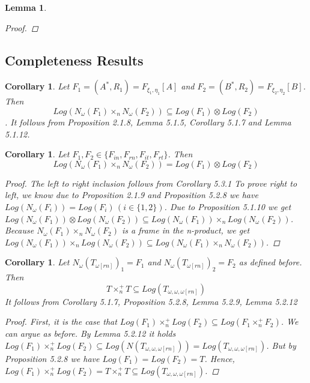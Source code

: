 \documentclass[12pt, a4paper]{scrartcl}
\newtheorem{lemma}[definition]{Lemma}
\newtheorem{corollary}[definition]{Corollary}
\begin{document}
\begin{lemma}
\begin{proof}
        \end{proof}
    \end{lemma}

    \subsection{Completeness Results}
    \begin{corollary}
        Let $F_1 = (A^*,R_1) = F_{\xi_1, \eta_1}[A]$ and $F_2 = (B^*,R_2) = F_{\xi_2, \eta_2}[B]$. Then 
        $$Log(N_\omega(F_1) \times_n N_\omega(F_2))  \subseteq Log(F_1) \otimes Log(F_2)$$.
        It follows from Proposition 2.1.8, Lemma 5.1.5, Corollary 5.1.7 and Lemma 5.1.12.
    \end{corollary}

    \begin{corollary}
        Let $F_1, F_2 \in \{F_{in}, F_{rn}, F_{it}, F_{rt}\}$. Then 
        $$Log(N_\omega(F_1) \times_nN_\omega(F_2)) = Log(F_1) \otimes Log(F_2)$$

        \begin{proof}
            The left to right inclusion follows from Corollary 5.3.1 \newline \newline
            To prove right to left, we know due to Proposition 2.1.9 and Proposition 5.2.8 we have $Log(N_\omega(F_i)) = Log(F_i) \, (i \in \{1,2\})$.
            Due to Proposition 5.1.10 we get $Log(N_\omega(F_1)) \otimes Log(N_\omega(F_2)) \subseteq Log(N_\omega(F_1)) \times_n Log(N_\omega(F_2))$. 
            Because $N_\omega(F_1)\times_n N_\omega(F_2)$ is a frame in the n-product, we get
            $Log(N_\omega(F_1)) \times_n Log(N_\omega(F_2)) \subseteq Log(N_\omega(F_1)\times_n N_\omega(F_2))$.

        \end{proof}

    \end{corollary}

    \begin{corollary}
        Let $N_\omega(T_{\omega[rn]})_1 = F_1$ and $N_\omega(T_{\omega[rn]})_2 = F_2$ as defined before. Then 
        $$T \times^+_n T \subseteq Log(T_{\omega,\omega,\omega[rn]})$$
        It follows from Corollary 5.1.7, Proposition 5.2.8, Lemma 5.2.9, Lemma 5.2.12

        \begin{proof}
            First, it is the case that $Log(F_1) \times^+_n Log(F_2) \subseteq Log(F_1 \times^+_n F_2)$. We can argue as before.
            By Lemma 5.2.12 it holds $Log(F_1) \times^+_n Log(F_2) \subseteq Log(N(T_{\omega,\omega,\omega[rn]})) = Log(T_{\omega,\omega,\omega[rn]})$.
            But by Proposition 5.2.8 we have $Log(F_1) = Log(F_2) = T$. Hence, $Log(F_1) \times^+_n Log(F_2) = T \times^+_n T \subseteq Log(T_{\omega,\omega,\omega[rn]})$.
        \end{proof}

    \end{corollary}
\end{document}
